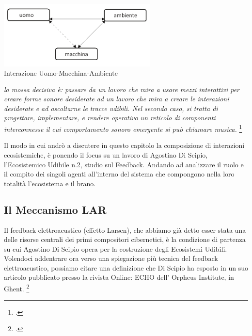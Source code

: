 \begin{center}
\vspace{0.5cm}
\includegraphics[width=8cm]{figures/uomo_macchina_ambiente.png} \\
{Interazione Uomo-Macchina-Ambiente} \\ 
\vspace{0.5cm}
\end{center}

\begin{center}
\vspace{0.5cm}
\textit{la mossa decisiva è: passare da un lavoro che mira a usare mezzi interattivi per creare forme sonore desiderate ad
un lavoro che mira a creare le interazioni desiderate e ad ascoltarne le tracce udibili. Nel secondo caso, si tratta
di progettare, implementare, e rendere operativo un reticolo di componenti interconnesse il cui comportamento
sonoro emergente si può chiamare musica.} \footcite{discipio_polverisonore_2016}
\vspace{0.5cm}
\end{center}

Il modo in cui andrò a discutere in questo capitolo la composizione di interazioni ecosistemiche, 
è ponendo il focus su un lavoro di Agostino Di Scipio, l’Ecosistemico Udibile n.2, studio sul Feedback. 
Andando ad analizzare il ruolo e il compito dei singoli agenti all'interno del sistema 
che compongono nella loro totalità l'ecosistema e il brano. 

\subsection{Il Meccanismo LAR}
\label{sec:Il Meccanismo LAR}
Il feedback elettroacustico (effetto Larsen), che abbiamo già detto
esser stata una delle risorse centrali dei primi compositori cibernetici,
è la condizione di partenza su cui Agostino Di Scipio opera per la costruzione degli Ecosistemi Udibili.
Volendoci addentrare ora verso una spiegazione più tecnica del feedback elettroacustico,
possiamo citare una definizione che Di Scipio ha esposto in un suo articolo
pubblicato presso la rivista Online: ECHO dell’ Orpheus Institute, in
Ghent. \footcite{di_scipio_relational_2022}

